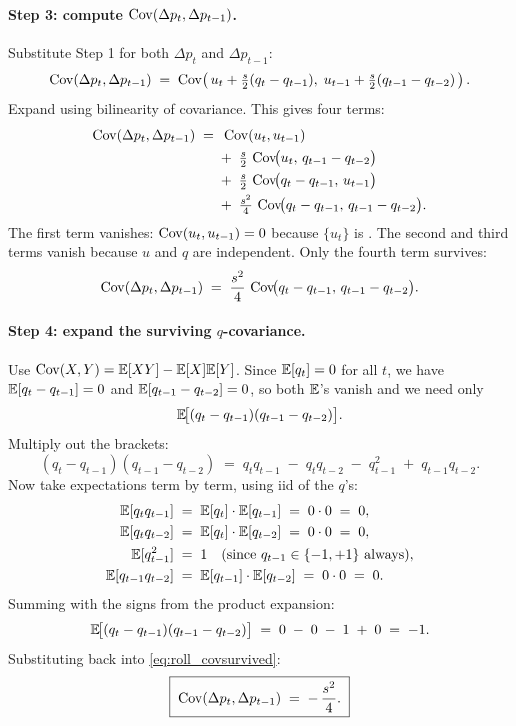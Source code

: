 \paragraph{Step 3: compute $\operatorname{Cov}(\Delta p_t, \Delta p_{t-1})$.}
Substitute Step 1 for both $\Delta p_t$ and $\Delta p_{t-1}$:
\[
  \operatorname{Cov}(\Delta p_t, \Delta p_{t-1})
  \;=\; \operatorname{Cov}\!\left(\,
          u_t + \tfrac{s}{2}(q_t - q_{t-1}),\;
          u_{t-1} + \tfrac{s}{2}(q_{t-1} - q_{t-2})
        \,\right).
\]
Expand using bilinearity of covariance. This gives four terms:
\begin{align*}
  \operatorname{Cov}(\Delta p_t, \Delta p_{t-1})
  \;=\;&\; \operatorname{Cov}(u_t, u_{t-1}) \\
    &+\; \tfrac{s}{2}\,\operatorname{Cov}\!\bigl(u_t,\, q_{t-1} - q_{t-2}\bigr) \\
    &+\; \tfrac{s}{2}\,\operatorname{Cov}\!\bigl(q_t - q_{t-1},\, u_{t-1}\bigr) \\
    &+\; \tfrac{s^2}{4}\,\operatorname{Cov}\!\bigl(q_t - q_{t-1},\, q_{t-1} - q_{t-2}\bigr).
\end{align*}
The first term vanishes: $\operatorname{Cov}(u_t, u_{t-1}) = 0$ because $\{u_t\}$
is \iid. The second and third terms vanish because $u$ and $q$
are independent. Only the fourth term survives:
\begin{equation}
  \operatorname{Cov}(\Delta p_t, \Delta p_{t-1})
  \;=\; \frac{s^2}{4}\,\operatorname{Cov}\!\bigl(q_t - q_{t-1},\, q_{t-1} - q_{t-2}\bigr).
  \label{eq:roll_covsurvived}
\end{equation}

\paragraph{Step 4: expand the surviving $q$-covariance.} Use
$\operatorname{Cov}(X,Y) = \mathbb{E}[XY] - \mathbb{E}[X]\mathbb{E}[Y]$. Since $\mathbb{E}[q_t] = 0$ for all
$t$, we have $\mathbb{E}[q_t - q_{t-1}] = 0$ and $\mathbb{E}[q_{t-1} - q_{t-2}] =
0$, so both $\mathbb{E}$'s vanish and we need only
\[
  \mathbb{E}\!\bigl[(q_t - q_{t-1})(q_{t-1} - q_{t-2})\bigr].
\]
Multiply out the brackets:
\[
  (q_t - q_{t-1})(q_{t-1} - q_{t-2})
  \;=\; q_t q_{t-1} \;-\; q_t q_{t-2} \;-\; q_{t-1}^2 \;+\; q_{t-1} q_{t-2}.
\]
Now take expectations term by term, using iid of the $q$'s:
\begin{align*}
  \mathbb{E}[q_t q_{t-1}]   &\;=\; \mathbb{E}[q_t] \cdot \mathbb{E}[q_{t-1}] \;=\; 0 \cdot 0 \;=\; 0, \\
  \mathbb{E}[q_t q_{t-2}]   &\;=\; \mathbb{E}[q_t] \cdot \mathbb{E}[q_{t-2}] \;=\; 0 \cdot 0 \;=\; 0, \\
  \mathbb{E}[q_{t-1}^2]     &\;=\; 1 \quad\text{(since $q_{t-1} \in \{-1,+1\}$ always)}, \\
  \mathbb{E}[q_{t-1} q_{t-2}] &\;=\; \mathbb{E}[q_{t-1}] \cdot \mathbb{E}[q_{t-2}] \;=\; 0 \cdot 0 \;=\; 0.
\end{align*}
Summing with the signs from the product expansion:
\[
  \mathbb{E}\!\bigl[(q_t - q_{t-1})(q_{t-1} - q_{t-2})\bigr]
  \;=\; 0 \;-\; 0 \;-\; 1 \;+\; 0
  \;=\; -1.
\]
Substituting back into \cref{eq:roll_covsurvived}:
\begin{equation}
  \boxed{\;\operatorname{Cov}(\Delta p_t, \Delta p_{t-1}) \;=\; -\,\frac{s^2}{4}.\;}
  \label{eq:roll_cov}
\end{equation}


